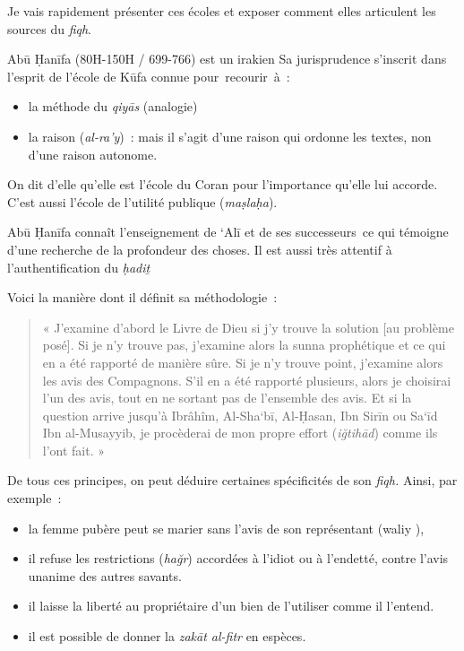 Je vais rapidement présenter ces écoles et exposer comment elles
articulent les sources du \emph{fiqh}.


Abū Ḥanīfa (80H-150H / 699-766) est un irakien Sa jurisprudence
s'inscrit dans l'esprit de l'école de Kūfa connue pour~recourir~à~:

\begin{itemize}
\item
  la méthode du \emph{qiyās} (analogie)
\item
  la raison (\emph{al-ra'y})~: mais il s'agit d'une raison qui ordonne
  les textes, non d'une raison autonome.
\end{itemize}

On dit d'elle qu'elle est l'école du Coran pour l'importance qu'elle lui
accorde. C'est aussi l'école de l'utilité publique (\emph{maṣlaḥa}).

Abū Ḥanīfa connaît l'enseignement de `Alī et de ses successeurs~ce qui
témoigne d'une recherche de la profondeur des choses. Il est aussi très
attentif à l'authentification du \emph{ḥadiṯ}

Voici la manière dont il définit sa méthodologie~:

\begin{quote}
« J'examine d'abord le Livre de Dieu si j'y trouve la solution {[}au
problème posé{]}. Si je n'y trouve pas, j'examine alors la sunna
prophétique et ce qui en a été rapporté de manière sûre. Si je n'y
trouve point, j'examine alors les avis des Compagnons. S'il en a été
rapporté plusieurs, alors je choisirai l'un des avis, tout en ne sortant
pas de l'ensemble des avis. Et si la question arrive jusqu'à Ibrâhîm,
Al-Sha`bī, Al-Ḥasan, Ibn Sirīn ou Sa`īd Ibn al-Musayyib, je procèderai
de mon propre effort (\emph{iğtihād}) comme ils l'ont fait. »
\end{quote}

De tous ces principes, on peut déduire certaines spécificités de son
\emph{fiqh.} Ainsi, par exemple~:

\begin{itemize}
\item
  la femme pubère peut se marier sans l'avis de son représentant (waliy
  ),
\item
  il refuse les restrictions (\emph{hağr}) accordées à l'idiot ou à
  l'endetté, contre l'avis unanime des autres savants.
\item
  il laisse la liberté au propriétaire d'un bien de l'utiliser comme il
  l'entend.
\item
  il est possible de donner la \emph{zakāt al-ﬁtr} en espèces.
\end{itemize}

